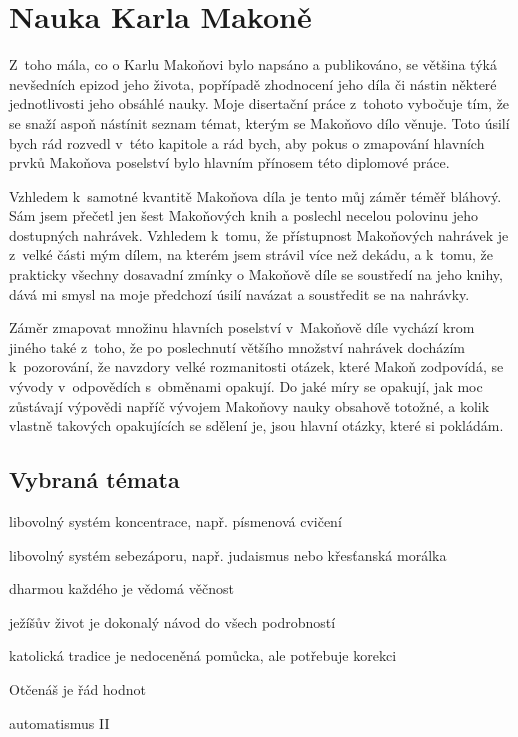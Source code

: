 \chapter{Nauka Karla Makoně}

Z~toho mála, co o Karlu Makoňovi bylo napsáno a publikováno, se většina týká
nevšedních epizod jeho života, popřípadě zhodnocení jeho díla či nástin některé
jednotlivosti jeho obsáhlé nauky. Moje disertační práce z~tohoto vybočuje tím,
že se snaží aspoň nástínit seznam témat, kterým se Makoňovo dílo věnuje. Toto
úsilí bych rád rozvedl v~této kapitole a rád bych, aby pokus o zmapování
hlavních prvků Makoňova poselství bylo hlavním přínosem této diplomové práce.

Vzhledem k~samotné kvantitě Makoňova díla je tento můj záměr téměř bláhový. Sám
jsem přečetl jen šest Makoňových knih a poslechl necelou polovinu jeho
dostupných nahrávek. Vzhledem k~tomu, že přístupnost Makoňových nahrávek je
z~velké části mým dílem, na kterém jsem strávil více než dekádu, a k~tomu, že
prakticky všechny dosavadní zmínky o Makoňově díle se soustředí na jeho knihy,
dává mi smysl na moje předchozí úsilí navázat a soustředit se na nahrávky.

Záměr zmapovat množinu hlavních poselství v~Makoňově díle vychází krom jiného
také z~toho, že po poslechnutí většího množství nahrávek docházím k~pozorování,
že navzdory velké rozmanitosti otázek, které Makoň zodpovídá, se vývody
v~odpovědích s~obměnami opakují. Do jaké míry se opakují, jak moc zůstávají
výpovědi napříč vývojem Makoňovy nauky obsahově totožné, a kolik vlastně
takových opakujících se sdělení je, jsou hlavní otázky, které si pokládám.

\section{Vybraná témata}

libovolný systém koncentrace, např. písmenová cvičení

libovolný systém sebezáporu, např. judaismus nebo křesťanská morálka

dharmou každého je vědomá věčnost

ježíšův život je dokonalý návod do všech podrobností

katolická tradice je nedoceněná pomůcka, ale potřebuje korekci

Otčenáš je řád hodnot

automatismus II

\section{}

